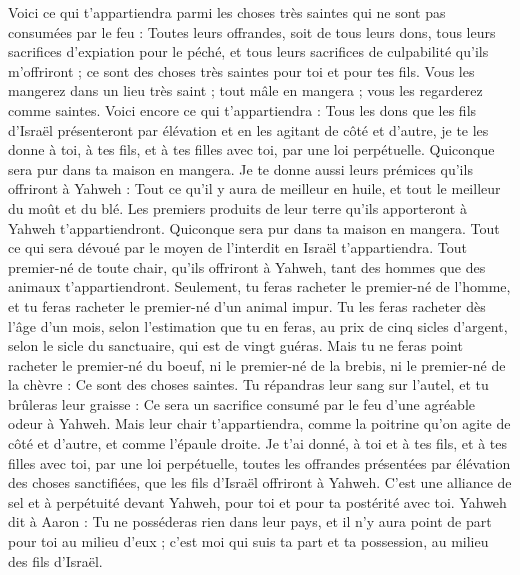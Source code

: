 \begin{multicols}{2}
Voici ce qui t'appartiendra parmi les choses très saintes qui ne sont pas consumées par le feu : Toutes leurs offrandes, soit de tous leurs dons, tous leurs sacrifices d’expiation pour le péché, et tous leurs sacrifices de culpabilité qu’ils m’offriront ; ce sont des choses très saintes pour toi et pour tes fils.
Vous les mangerez dans un lieu très saint ; tout mâle en mangera ; vous les regarderez comme saintes.
Voici encore ce qui t'appartiendra : Tous les dons que les fils d'Israël présenteront par élévation et en les agitant de côté et d’autre, je te les donne à toi, à tes fils, et à tes filles avec toi, par une loi perpétuelle. Quiconque sera pur dans ta maison en mangera.
Je te donne aussi leurs prémices qu'ils offriront à Yahweh : Tout ce qu’il y aura de meilleur en huile, et tout le meilleur du moût et du blé.
Les premiers produits de leur terre qu'ils apporteront à Yahweh t'appartiendront. Quiconque sera pur dans ta maison en mangera.
Tout ce qui sera dévoué par le moyen de l’interdit en Israël t'appartiendra.
Tout premier-né de toute chair, qu'ils offriront à Yahweh, tant des hommes que des animaux t'appartiendront. Seulement, tu feras racheter le premier-né de l'homme, et tu feras racheter  le premier-né d’un animal impur.
Tu les feras racheter dès l'âge d'un mois, selon l'estimation que tu en feras, au prix de cinq sicles d'argent, selon le sicle du sanctuaire, qui est de vingt guéras.
Mais tu ne feras point racheter le premier-né du boeuf, ni le premier-né de la brebis, ni le premier-né de la chèvre : Ce sont des choses saintes. Tu répandras leur sang sur l'autel, et tu brûleras leur graisse : Ce sera un sacrifice consumé par le feu d’une agréable odeur à Yahweh.
Mais leur chair t'appartiendra, comme la poitrine qu’on agite de côté et d’autre, et comme l'épaule droite.
Je t'ai donné, à toi et à tes fils, et à tes filles avec toi, par une loi perpétuelle, toutes les offrandes présentées par élévation des choses sanctifiées, que les fils d'Israël offriront à Yahweh. C’est une alliance de sel et à perpétuité devant Yahweh, pour toi et pour ta postérité avec toi.
Yahweh dit à Aaron : Tu ne posséderas rien dans leur pays, et il n’y aura point de part pour toi au milieu d’eux ; c’est moi qui suis ta part et ta possession, au milieu des fils d'Israël.

\end{multicols}
